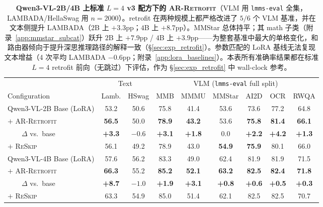 \documentclass{article}
\newcommand{\reskip}{\textsc{ReSkip}}
\newcommand{\retrofit}{\textsc{AR-Retrofit}}
\begin{document}
\begin{table}[t]
\caption{\textbf{Qwen3-VL-2B/4B 上标准 $L{=}4$ v3 配方下的 \retrofit{}}（VLM 用 \texttt{lmms-eval} 全集，LAMBADA/HellaSwag 用 $n{=}2000$）。retrofit 在两种规模上都严格改进了 $5/6$ 个 VLM 基准，并在文本侧提升 LAMBADA（$2$B 上 $+3.3$pp；$4$B 上 $+8.7$pp）。MMStar 总体持平；其 math 子类（附录~\ref{app:mmstar_subcat}）跃升 $2$B 上 $+7.9$pp / $4$B 上 $+3.9$pp——为整套基准中最大的单格变化，和路由器倾向于提升深思推理路径的解释一致（\S\ref{sec:exp_retrofit}）。参数匹配的 LoRA 基线无法复现文本增益（4 次平均 LAMBADA $-0.6$pp；附录~\ref{app:lora_baselines}）。本表所有准确率结果都在标准 $L{=}4$ retrofit 前向（无跳过）下评估，作为 \S\ref{sec:exp_retrofit} 中 wall-clock 参考。}
\label{tab:retrofit_main}
\centering\small
\setlength{\tabcolsep}{4pt}
\begin{tabular}{lcccccccc}
\toprule
& \multicolumn{2}{c}{Text} & \multicolumn{6}{c}{VLM (\texttt{lmms-eval} full split)} \\
\cmidrule(lr){2-3}\cmidrule(lr){4-9}
Configuration & Lamb. & HSwag & MMB & MMMU & MMStar & AI2D & OCR & RWQA \\
\midrule
Qwen3-VL-2B Base (LoRA)               & 53.2 & 50.6 & 75.8 & 41.4 & 53.6 & 73.6 & 77.2 & 64.8 \\
$+$ \retrofit{}                       & \textbf{56.5} & 50.0 & \textbf{78.9} & \textbf{43.2} & 53.6 & \textbf{75.8} & \textbf{81.4} & \textbf{66.1} \\
~~~~$\Delta$ vs.\ base                & \textbf{+3.3} & $-0.6$ & \textbf{+3.1} & \textbf{+1.8} & $0.0$ & \textbf{+2.2} & \textbf{+4.2} & \textbf{+1.3} \\
$+$ \reskip{}                         & 56.1 & 49.2 & 78.9 & 43.0 & \textbf{54.9} & \textbf{75.9} & 80.1 & 66.0 \\
\midrule
Qwen3-VL-4B Base (LoRA)               & 57.6 & 56.2 & 83.3 & 49.0 & 62.4 & 81.9 & 81.9 & 71.5 \\
$+$ \retrofit{}                       & \textbf{66.3} & 55.2 & \textbf{85.2} & \textbf{52.1} & \textbf{63.2} & \textbf{82.5} & \textbf{82.4} & \textbf{71.8} \\
~~~~$\Delta$ vs.\ base                & \textbf{+8.7} & $-1.0$ & \textbf{+1.9} & \textbf{+3.1} & \textbf{+0.8} & \textbf{+0.6} & \textbf{+0.5} & \textbf{+0.3} \\
$+$ \reskip{}                         & 63.3 & 54.9 & 85.0 & 51.4 & 62.1 & 82.5 & 82.5 & 70.7 \\
\bottomrule
\end{tabular}
\end{table}
\end{document}
